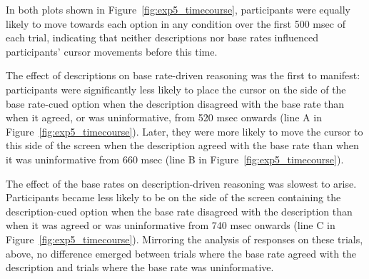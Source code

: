 In both plots shown in Figure~\ref{fig:exp5_timecourse},
participants were equally likely to move towards each option
in any condition over the first 500 msec of each trial,
indicating that neither descriptions nor base rates
influenced participants' cursor movements before this time.

The effect of descriptions on base rate-driven reasoning was the first to manifest:
participants were significantly less likely
to place the cursor on the side of the base rate-cued option
when the description disagreed with the base rate
than when it agreed, or was uninformative,
from 520 msec onwards (line A in Figure~\ref{fig:exp5_timecourse}).
Later, they were more likely to move the cursor to this side of the screen
when the description agreed with the base rate
than when it was uninformative from 660 msec (line B in Figure~\ref{fig:exp5_timecourse}).

The effect of the base rates on description-driven reasoning was slowest to arise.
Participants became less likely to be
on the side of the screen containing the description-cued option
when the base rate disagreed with the description
than when it was agreed or was uninformative
from 740 msec onwards (line C in Figure~\ref{fig:exp5_timecourse}).
Mirroring the analysis of responses on these trials, above,
no difference emerged between
trials where the base rate agreed with the description
and trials where the base rate was uninformative.


